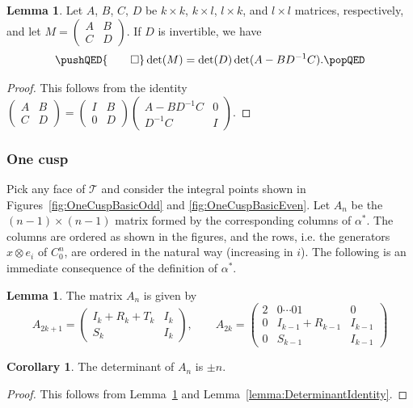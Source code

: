 \documentclass[12pt]{amsart}
\theoremstyle{definition}
\newtheorem{lemma}[theorem]{Lemma}
\newtheorem{corollary}[theorem]{Corollary}
\numberwithin{equation}{section}
\def\D{\Delta}
\def\S{\Sigma}
\def\C{\mathbb{C}}
\def\T{\mathcal{T}}
\begin{document}
\begin{lemma}\label{lemma:BlockDeterminant}
Let $A$, $B$, $C$, $D$ be $k\times k$, $k\times l$, $l\times k$, and $l\times l$ matrices, respectively, and let $M=\left(\begin{smallmatrix}A &B\\C&D\end{smallmatrix}\right)$. If $D$ is invertible, we have
\begin{equation}
\pushQED{\qed}
\det(M)=\det(D)\det(A-BD^{-1}C).\qedhere\popQED
\end{equation}
\end{lemma}
\begin{proof}
This follows from the identity $\left(\begin{smallmatrix}A &B\\C&D\end{smallmatrix}\right)=\left(\begin{smallmatrix}I &B\\0&D\end{smallmatrix}\right)\left(\begin{smallmatrix}A-BD^{-1}C &0\\D^{-1}C&I\end{smallmatrix}\right)$.
\end{proof}
  
\subsubsection{One cusp}
Pick any face of $\T$ and consider the integral points shown in Figures~\ref{fig:OneCuspBasicOdd} and \ref{fig:OneCuspBasicEven}. Let $A_n$ be the $(n-1)\times(n-1)$ matrix formed by the corresponding columns of $\alpha^*$. The columns are ordered as shown in the figures, and the rows, i.e. the generators $x\otimes e_i$ of $C^n_0$, are ordered in the natural way (increasing in $i$). The following is an immediate consequence of the definition of $\alpha^*$.
\begin{lemma}
The matrix $A_n$ is given by
\begin{equation}
A_{2k+1}=\begin{pmatrix}I_k+R_k+T_k&I_k\\S_k&I_k\end{pmatrix},\qquad A_{2k}=\begin{pmatrix}2&0\cdots01&0\\0&I_{k-1}+R_{k-1}&I_{k-1}\\0&S_{k-1}&I_{k-1}\end{pmatrix}
\end{equation}
\end{lemma}
\begin{corollary}
The determinant of $A_n$ is $\pm n$.
\end{corollary}
\begin{proof}
This follows from Lemma~\ref{lemma:BlockDeterminant} and Lemma~\ref{lemma:DeterminantIdentity}.
\end{proof}
\end{document}
